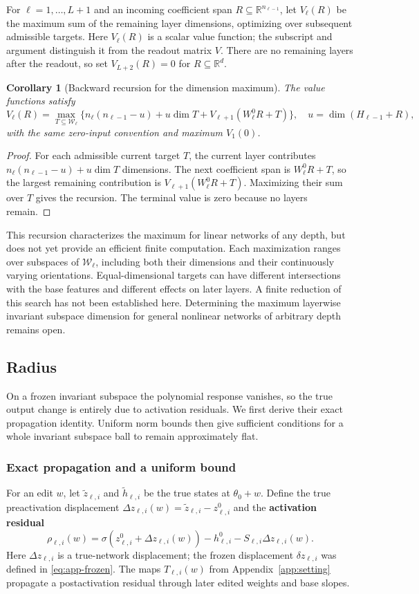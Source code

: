 \documentclass[twoside]{article}
\newtheorem{corollary}[theorem]{Corollary}
\theoremstyle{remark}
\newcommand{\R}{\mathbb R}
\theoremstyle{highlightdefinition}
\theoremstyle{remark}
\begin{document}
For $\ell=1,\ldots,L+1$ and an incoming coefficient span $R\subseteq\R^{n_{\ell-1}}$, let $V_\ell(R)$ be the maximum sum of the remaining layer dimensions, optimizing over subsequent admissible targets. Here $V_\ell(R)$ is a scalar value function; the subscript and argument distinguish it from the readout matrix $V$. There are no remaining layers after the readout, so set $V_{L+2}(R)=0$ for $R\subseteq\R^d$. 
\begin{corollary}[Backward recursion for the dimension maximum]
The value functions satisfy
\[
 V_\ell(R)=\max_{T\subseteq\mathcal W_\ell}
 \{n_\ell(n_{\ell-1}-u)+u\dim T+V_{\ell+1}(W_\ell^0R+T)\},
 \quad u=\dim(H_{\ell-1}+R),
\]
with the same zero-input convention and maximum $V_1(0)$.
\end{corollary}
\begin{proof}
For each admissible current target $T$, the current layer contributes $n_\ell(n_{\ell-1}-u)+u\dim T$ dimensions. The next coefficient span is $W_\ell^0R+T$, so the largest remaining contribution is $V_{\ell+1}(W_\ell^0R+T)$. Maximizing their sum over $T$ gives the recursion. The terminal value is zero because no layers remain.
\end{proof}

This recursion characterizes the maximum for linear networks of any depth, but does not yet provide an efficient finite computation. Each maximization ranges over subspaces of $\mathcal W_\ell$, including both their dimensions and their continuously varying orientations. Equal-dimensional targets can have different intersections with the base features and different effects on later layers. A finite reduction of this search has not been established here. Determining the maximum layerwise invariant subspace dimension for general nonlinear networks of arbitrary depth remains open.

\subsection{Radius}
\label{app:radius-proof}
On a frozen invariant subspace the polynomial response vanishes, so the true output change is entirely due to activation residuals. We first derive their exact propagation identity. Uniform norm bounds then give sufficient conditions for a whole invariant subspace ball to remain approximately flat.

\subsubsection{Exact propagation and a uniform bound}
For an edit $w$, let $\widetilde z_{\ell,i}$ and $\widetilde h_{\ell,i}$ be the true states at $\theta_0+w$. Define the true preactivation displacement $\Delta z_{\ell,i}(w)=\widetilde z_{\ell,i}-z_{\ell,i}^0$ and the \textbf{activation residual}
\[
 \rho_{\ell,i}(w)=\sigma(z_{\ell,i}^0+\Delta z_{\ell,i}(w))
              -h_{\ell,i}^0-S_{\ell,i}\Delta z_{\ell,i}(w).
\]
Here $\Delta z_{\ell,i}$ is a true-network displacement; the frozen displacement $\delta z_{\ell,i}$ was defined in \eqref{eq:app-frozen}. The maps $T_{\ell,i}(w)$ from Appendix~\ref{app:setting} propagate a postactivation residual through later edited weights and base slopes.
\end{document}
